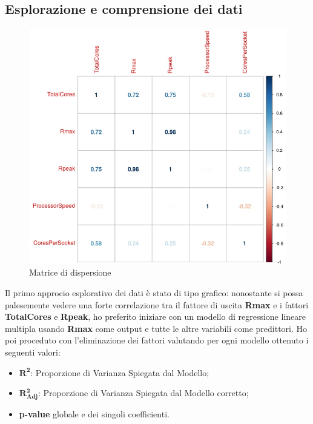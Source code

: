 \documentclass[11pt,a4paper]{article}
\begin{document}
\subsection{Esplorazione e comprensione dei dati}
\begin{figure}
	\vspace{-1.3cm}
	\centering
	\caption{Matrice di dispersione}
	\includegraphics[scale=0.39]{imgs/cor_mat.jpeg}
	\vspace{-1.0cm}
\end{figure}
Il primo approcio esplorativo dei dati \`e stato di tipo grafico: nonostante si
possa palesemente vedere una forte correlazione tra il fattore di uscita
\textbf{Rmax} e i fattori \textbf{TotalCores} e \textbf{Rpeak}, ho preferito
iniziare con un modello di regressione lineare multipla usando \textbf{Rmax}
come output e tutte le altre variabili come predittori. Ho poi proceduto con
l'eliminazione dei fattori valutando per ogni modello ottenuto i seguenti
valori:
\begin{itemize}
	\setlength\itemsep{0mm}
	\item $\boldsymbol{R^2}$: Proporzione di Varianza Spiegata dal Modello;
	\item $\boldsymbol{R^2_{Adj}}$: Proporzione di Varianza Spiegata dal
		Modello corretto;
	\item \textbf{p-value} globale e dei singoli coefficienti.
\end{itemize}
\end{document}
